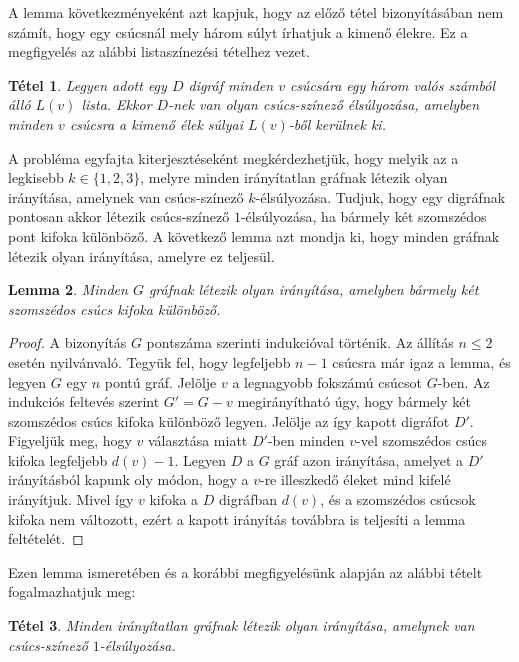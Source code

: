 \documentclass[12pt, a4paper]{report}
\newtheorem{tét}{Tétel}[section]
\newtheorem{lem}[tét]{Lemma}
\theoremstyle{remark}
\theoremstyle{definition}
\begin{document}
A lemma következményeként azt kapjuk, hogy az előző tétel bizonyításában nem számít, hogy egy csúcsnál mely három súlyt írhatjuk a kimenő élekre. Ez a megfigyelés az alábbi listaszínezési tételhez vezet.

\begin{tét}
Legyen adott egy $D$ digráf minden $v$ csúcsára egy három valós számból álló $L(v)$ lista. Ekkor $D$-nek van olyan csúcs-színező élsúlyozása, amelyben minden $v$ csúcsra a kimenő élek súlyai $L(v)$-ből kerülnek ki.
\end{tét}

A probléma egyfajta kiterjesztéseként megkérdezhetjük, hogy melyik az a legkisebb $k \in \lbrace 1, 2, 3 \rbrace$, melyre minden irányítatlan gráfnak létezik olyan irányítása, amelynek van csúcs-színező $k$-élsúlyozása. Tudjuk, hogy egy digráfnak pontosan akkor létezik csúcs-színező $1$-élsúlyozása, ha bármely két szomszédos pont kifoka különböző. A következő lemma azt mondja ki, hogy minden gráfnak létezik olyan irányítása, amelyre ez teljesül.

\begin{lem}
Minden $G$ gráfnak létezik olyan irányítása, amelyben bármely két szomszédos csúcs kifoka különböző.
\end{lem}

\begin{proof}
A bizonyítás $G$ pontszáma szerinti indukcióval történik. Az állítás $n \leq 2$ esetén nyilvánvaló. Tegyük fel, hogy legfeljebb $n - 1$ csúcsra már igaz a lemma, és legyen $G$ egy $n$ pontú gráf. Jelölje $v$ a legnagyobb fokszámú csúcsot $G$-ben. Az indukciós feltevés szerint $G' = G - v$ megirányítható úgy, hogy bármely két szomszédos csúcs kifoka különböző legyen. Jelölje az így kapott digráfot $D'$. Figyeljük meg, hogy $v$ választása miatt $D'$-ben minden $v$-vel szomszédos csúcs kifoka legfeljebb $d(v) - 1$. Legyen $D$ a $G$ gráf azon irányítása, amelyet a $D'$ irányításból kapunk oly módon, hogy a $v$-re illeszkedő éleket mind kifelé irányítjuk. Mivel így $v$ kifoka a $D$ digráfban $d(v)$, és a szomszédos csúcsok kifoka nem változott, ezért a kapott irányítás továbbra is teljesíti a lemma feltételét.
\end{proof}

Ezen lemma ismeretében és a korábbi megfigyelésünk alapján az alábbi tételt fogalmazhatjuk meg:

\begin{tét}
Minden irányítatlan gráfnak létezik olyan irányítása, amelynek van csúcs-színező $1$-élsúlyozása.
\end{tét}
\end{document}

